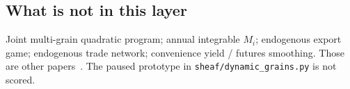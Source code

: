 \subsection{What is not in this layer}

Joint multi-grain quadratic program; annual integrable \(M_i\); endogenous
export game; endogenous trade network; convenience yield / futures
smoothing. Those are other papers~\citep{armington1969,takayama1971}.
The paused prototype in \texttt{sheaf/dynamic\_grains.py} is not scored.
